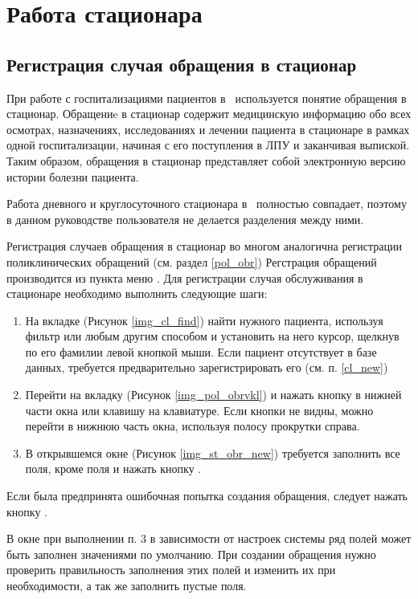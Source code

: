 \newpage
\section{Работа стационара}

\subsection{Регистрация случая обращения в стационар}
При работе с госпитализациями пациентов в \tmis~используется понятие обращения в стационар. Обращениe в стационар содержит медицинскую информацию обо всех осмотрах, назначениях, исследованиях и лечении пациента в стационаре в рамках одной госпитализации, начиная с его поступления в ЛПУ и заканчивая выпиской. Таким образом, обращения в стационар представляет собой электронную версию истории болезни пациента.

Работа дневного и круглосуточного стационара в \tmis~полностью совпадает, поэтому в данном руководстве пользователя не делается разделения между ними.

Регистрация случаев обращения в стационар во многом аналогична регистрации поликлинических обращений (см. раздел \ref{pol_obr}) Регстрация обращений производится из пункта меню . Для регистрации случая обслуживания в стационаре необходимо выполнить следующие шаги:
\begin{enumerate}
 \item На вкладке  (Рисунок \ref{img_cl_find}) найти нужного пациента, используя фильтр или любым другим способом и установить на него курсор, щелкнув по его фамилии левой кнопкой мыши. Если пациент отсутствует в базе данных, требуется предварительно зарегистрировать его (см. п. \ref{cl_new})
 \item Перейти на вкладку  (Рисунок \ref{img_pol_obrvkl}) и нажать кнопку   в нижней части окна или клавишу  на клавиатуре. Если кнопки не видны, можно перейти в нижнюю часть окна, используя полосу прокрутки справа.
 \item В открывшемся окне  (Рисунок \ref{img_st_obr_new}) требуется заполнить все поля, кроме поля  и нажать кнопку .
\end{enumerate}
 
Если была предпринята ошибочная попытка создания обращения, следует нажать кнопку .
 
В окне  при выполнении п. 3 в зависимости от настроек системы ряд полей может быть заполнен значениями по умолчанию. При создании обращения нужно проверить правильность заполнения этих полей и изменить их при необходимости, а так же заполнить пустые поля.

